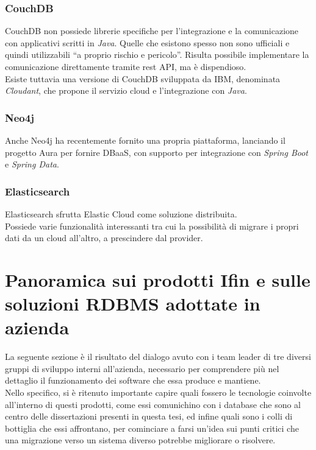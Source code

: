 \subsubsection{CouchDB}
CouchDB non possiede librerie specifiche per l'integrazione e la comunicazione con applicativi scritti in \textit{Java}. Quelle che esistono spesso non sono ufficiali e quindi utilizzabili ``a proprio rischio e pericolo''. Risulta possibile implementare la comunicazione direttamente tramite \gls{rest API}, ma è dispendioso.\\
Esiste tuttavia una versione di CouchDB sviluppata da IBM, denominata \textit{Cloudant}, che propone il servizio cloud e l'integrazione con \textit{Java}\cite{site:udemycouchdb}.

\subsubsection{Neo4j}
Anche Neo4j ha recentemente fornito una propria piattaforma, lanciando il progetto Aura per fornire \gls{DBaaS}, con supporto per integrazione con \textit{Spring Boot} e \textit{Spring Data}\cite{site:udemyneo4j}.

\subsubsection{Elasticsearch}
Elasticsearch sfrutta Elastic Cloud come soluzione distribuita.\\
Possiede varie funzionalità interessanti tra cui la possibilità di migrare i propri dati da un cloud all'altro, a prescindere dal provider\cite{site:udemyelasticsearch}.


\section{Panoramica sui prodotti Ifin e sulle soluzioni RDBMS adottate in azienda}

La seguente sezione è il risultato del dialogo avuto con i team leader di tre diversi gruppi di sviluppo interni all'azienda, necessario per comprendere più nel dettaglio il funzionamento dei software che essa produce e mantiene.\\
Nello specifico, si è ritenuto importante capire quali fossero le tecnologie coinvolte all'interno di questi prodotti, come essi comunichino con i database che sono al centro delle dissertazioni presenti in questa tesi, ed infine quali sono i colli di bottiglia che essi affrontano, per cominciare a farsi un'idea sui punti critici che una migrazione verso un sistema diverso potrebbe migliorare o risolvere.\\

